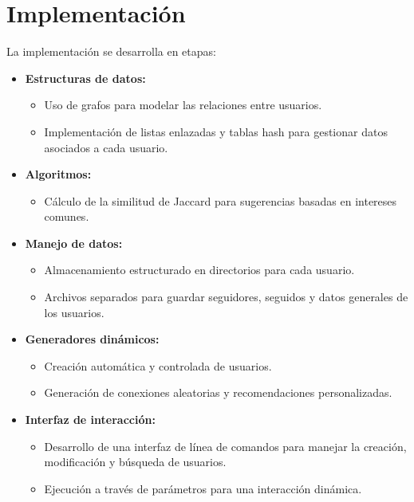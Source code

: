 \section{Implementación}

La implementación se desarrolla en etapas:

\begin{itemize}
    \item \textbf{Estructuras de datos:}
    \begin{itemize}
        \item Uso de grafos para modelar las relaciones entre usuarios.
        \item Implementación de listas enlazadas y tablas hash para gestionar datos asociados a cada usuario.
    \end{itemize}

    \item \textbf{Algoritmos:}
    \begin{itemize}
        \item Cálculo de la similitud de Jaccard para sugerencias basadas en intereses comunes.
    \end{itemize}

    \item \textbf{Manejo de datos:}
    \begin{itemize}
        \item Almacenamiento estructurado en directorios para cada usuario.
        \item Archivos separados para guardar seguidores, seguidos y datos generales de los usuarios.
    \end{itemize}

    \item \textbf{Generadores dinámicos:}
    \begin{itemize}
        \item Creación automática y controlada de usuarios.
        \item Generación de conexiones aleatorias y recomendaciones personalizadas.
    \end{itemize}

    \item \textbf{Interfaz de interacción:}
    \begin{itemize}
        \item Desarrollo de una interfaz de línea de comandos para manejar la creación, modificación y búsqueda de usuarios.
        \item Ejecución a través de parámetros para una interacción dinámica.
    \end{itemize}
\end{itemize}

